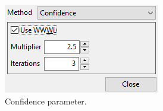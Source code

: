 \begin{itemize}
	\begin{figure}[!htb]
	\centering
	\includegraphics[scale=0.7]{../user_guide_figures/invesalius_screen/segmentation_region_growing_confidence_parameter_en.png}
    \caption{Confidence parameter.}
	\label{fig:segmentation_region_growing_confidence_parameter}
	\end{figure}


\end{itemize}
